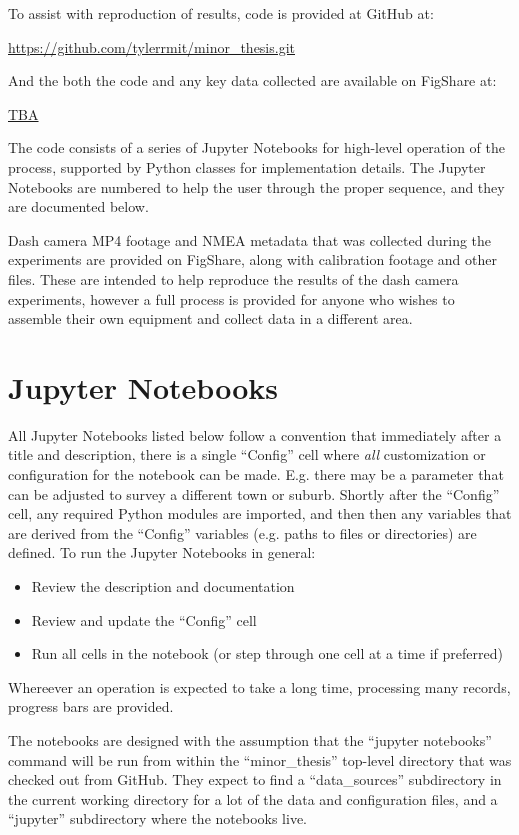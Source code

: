 \documentclass[11pt,twoside]{report}
\begin{document}
To assist with reproduction of results, code is provided at GitHub at:

\url{https://github.com/tylerrmit/minor_thesis.git}

And the both the code and any key data collected are available on FigShare at:

\url{TBA}

The code consists of a series of Jupyter Notebooks for high-level operation of the process, supported by Python classes for implementation details.  The Jupyter Notebooks are numbered to help the user through the proper sequence, and they are documented below.

Dash camera MP4 footage and NMEA metadata that was collected during the experiments are provided on FigShare, along with calibration footage and other files.  These are intended to help reproduce the results of the dash camera experiments, however a full process is provided for anyone who wishes to assemble their own equipment and collect data in a different area.

\section{Jupyter Notebooks}
\label{aj}

All Jupyter Notebooks listed below follow a convention that immediately after a title and description, there is a single ``Config'' cell where \textit{all} customization or configuration for the notebook can be made.  E.g. there may be a parameter that can be adjusted to survey a different town or suburb.  Shortly after the ``Config'' cell, any required Python modules are imported, and then then any variables that are derived from the ``Config'' variables (e.g. paths to files or directories) are defined.  To run the Jupyter Notebooks in general:

\begin{itemize}
\item{Review the description and documentation}
\item{Review and update the ``Config'' cell}
\item{Run all cells in the notebook (or step through one cell at a time if preferred)}	
\end{itemize}
Whereever an operation is expected to take a long time, processing many records, progress bars are provided.

The notebooks are designed with the assumption that the ``jupyter notebooks'' command will be run from within the ``minor\_thesis'' top-level directory that was checked out from GitHub.  They expect to find a ``data\_sources'' subdirectory in the current working directory for a lot of the data and configuration files, and a ``jupyter'' subdirectory where the notebooks live.
\end{document}
